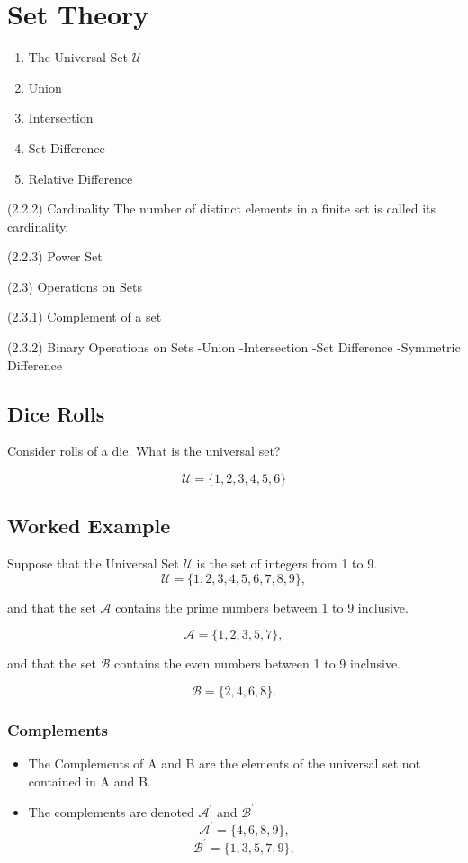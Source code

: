 \documentclass{article}
\begin{document}
\section{Set Theory}
\begin{enumerate}
\item The Universal Set $\mathcal{U}$
\item Union
\item Intersection
\item Set Difference
\item Relative Difference
\end{enumerate}

(2.2.2) Cardinality
The number of distinct elements in a finite set is called its cardinality.


(2.2.3) Power Set

(2.3) Operations on Sets

(2.3.1) Complement of a set


(2.3.2) Binary Operations on Sets
-Union
-Intersection
-Set Difference
-Symmetric Difference

\newpage
\subsection*{Dice Rolls}
Consider rolls of a die. What is the universal set?

\[ \mathcal{U} = \{1,2,3,4,5,6\} \]

\subsection*{Worked Example}

Suppose that the Universal Set $\mathcal{U}$ is the set of integers from 1 to 9.
\[ \mathcal{U} = \{1,2,3,4,5,6,7,8,9\}, \]

and that the set $\mathcal{A}$ contains the prime numbers between 1 to 9 inclusive.

\[ \mathcal{A} = \{1,2,3,5,7\}, \]

and that the set $\mathcal{B}$ contains the even numbers between 1 to 9 inclusive.

\[ \mathcal{B} = \{2,4,6,8\}. \]

\subsubsection*{Complements}
\begin{itemize}

\item The Complements of A and B are the elements of the universal set not contained in A and B.

\item The complements are denoted $\mathcal{A}^{\prime}$ and $\mathcal{B}^{\prime}$
\[ \mathcal{A}^{\prime} = \{4,6,8,9\}, \]
\[ \mathcal{B}^{\prime} = \{1,3,5,7,9\}, \]

\end{itemize}
\end{document}
